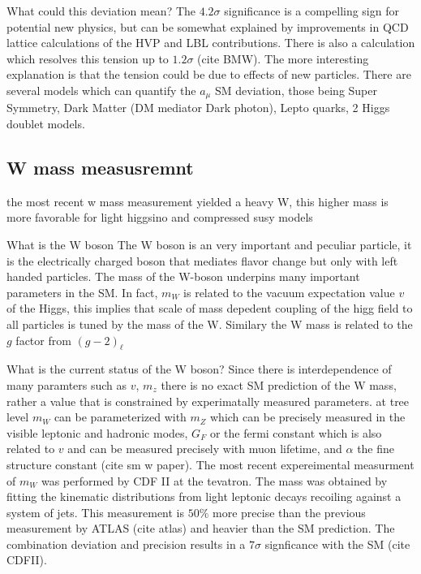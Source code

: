 What could this deviation mean?
The $4.2\sigma$ significance is a compelling sign for potential new physics, but can be somewhat explained by improvements in QCD lattice calculations of the HVP and LBL contributions. There is also a calculation which resolves this tension up to $1.2\sigma$ (cite BMW). The more interesting explanation is that the tension could be due to effects of new particles. There are several models which can quantify the $a_\mu$ SM deviation, those being Super Symmetry, Dark Matter (DM mediator Dark photon), Lepto quarks, 2 Higgs doublet models.



\subsection{W mass measusremnt}
the most recent w mass measurement yielded a heavy W, this higher mass is more favorable for light higgsino and compressed susy models

What is the W boson
The W boson is an very important and peculiar particle, it is the electrically charged boson that mediates flavor change but only with left handed particles.  The mass of the W-boson underpins many important parameters in the SM. In fact, $m_W$ is related to the vacuum expectation value $v$ of the Higgs, this implies that scale of mass depedent coupling of the higg field to all particles is tuned by the mass of the W. Similary the W mass is related to the $g$ factor from $(g-2)_\ell$ 

What is the current status of the W boson?
Since there is interdependence of many paramters such as $v$, $m_z$ there is no exact SM prediction of the W mass, rather a value that is constrained by experimatally measured parameters. at tree level $m_W$ can be parameterized with $m_Z$ which can be precisely measured in the visible leptonic and hadronic modes, $G_F$ or the fermi constant which is also related to $v$ and can be measured precisely with muon lifetime, and $\alpha$ the fine structure constant (cite sm w paper). The most recent expereimental measurment of $m_W$ was performed by CDF II at the tevatron. The mass was obtained by fitting the kinematic distributions from light leptonic decays recoiling against a system of jets. This measurement is $50\%$ more precise than the previous measurement by ATLAS (cite atlas) and heavier than the SM prediction. The combination deviation and precision results in a $7\sigma$ signficance with the SM (cite CDFII).  


